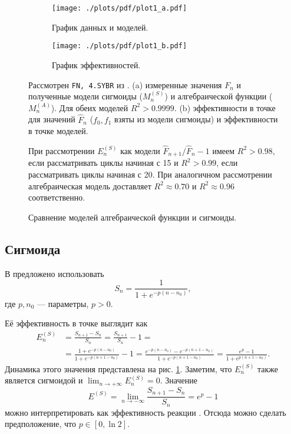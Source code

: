 \begin{figure}
  {\centering

    \begin{subfigure}{\textwidth}
      \centering
      \texttt{[image: ./plots/pdf/plot1\_a.pdf]}
      \caption{График данных и моделей.}
    \end{subfigure}

    \begin{subfigure}{\textwidth}
      \centering
      \texttt{[image: ./plots/pdf/plot1\_b.pdf]}
      \caption{График эффективностей.}
    \end{subfigure}

    \caption{Сравнение моделей алгебраической функции и сигмоиды.}
    \label{fig:model_comparison}

  }

  Рассмотрен {\tt FN, 4.SYBR} из
  \cite{karlenStatisticalSignificanceQuantitative2007}. (a) измеренные
  значения $F_{n}$ и полученные модели сигмоиды ($M_{n}^{(S)}$) и
  алгебраической функции ($M_{n}^{(A)}$). Для обеих моделей $R^{2}>0.9999$.
  (b) эффективности в точке для значений $\hat{F}_{n}$ ($f_0,f_1$ взяты из
  модели сигмоиды) и эффективности в точке моделей.

  При рассмотрении $E^{(S)}_{n}$ как модели $\hat F_{n+1}/\hat F_{n}-1$ имеем
  $R^{2}>0.98$, если рассматривать циклы начиная с 15 и $R^{2}>0.99$, если
  рассматривать циклы начиная с 20. При аналогичном рассмотрении
  алгебраическая модель доставляет $R^{2}\approx 0.70$ и $R^{2}\approx 0.96$
  соответственно.
\end{figure}

\subsection{Сигмоида}

В \cite{liuValidationQuantitativeMethod2002,
  rutledgeSigmoidalCurvefittingRedefines2004,
  liuProgressCurveAnalysis2011} предложено использовать
\[
  S_{n}=\frac{1}{1+e^{-p(n-n_0)}},
\]
где $p,n_0$ --- параметры, $p> 0$.

Её эффективность в точке выглядит как
\[
  \begin{aligned}
    E^{(S)}_{n}
     & =\frac{S_{n+1}-S_{n}}{S_{n}}=\frac{S_{n+1}}{S_{n}}-1= \\
     & =\frac{1+e^{-p(n-n_0)}}{1+e^{-p(n+1-n_0)}}-1=
    \frac{e^{-p(n-n_0)}-e^{-p(n+1-n_0)}}{1+e^{-p(n+1-n_0)}}=
    \frac{e^{p}-1}{1+e^{p(n+1-n_0)}}.
  \end{aligned}
\]
Динамика этого значения представлена на рис. \ref{fig:model_comparison}.
Заметим, что $E^{(S)}_{n}$ также является сигмоидой и
$\lim_{n\to+\infty}E^{(S)}_{n}=0$. Значение
\[
  E^{(S)}=\lim_{n\to-\infty}\frac{S_{n+1}-S_{n}}{S_{n}}=e^{p}-1
\]
можно интерпретировать как эффективность реакции
\cite{swillensRevisitingSigmoidalCurve2008}. Отсюда можно сделать
предположение, что $p\in [0,\ln 2]$.

